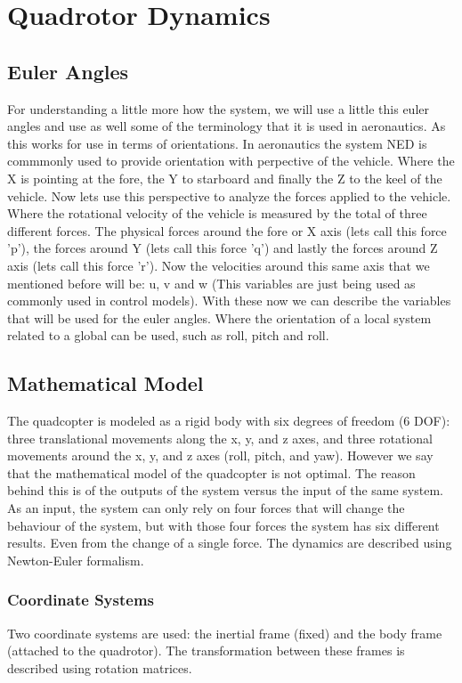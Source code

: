 \documentclass[a4paper,12pt]{report}
\begin{document}
\chapter{Quadrotor Dynamics}

\section{Euler Angles}
For understanding a little more how the system, we will use a little this euler angles and use as well some of the terminology that it is used in aeronautics. As this works for use in terms of orientations.
In aeronautics the system NED is commmonly used to provide orientation with perpective of the vehicle. Where the X is pointing at the fore, the Y to starboard and finally the Z to the keel of the vehicle.
Now lets use this perspective to analyze the forces applied to the vehicle. Where the rotational velocity of the vehicle is measured by the total of three different forces.
The physical forces around the fore or X axis (lets call this force 'p'), the forces around Y  (lets call this force 'q') and lastly the forces around Z axis (lets call this force 'r').
Now the velocities around this same axis that we mentioned before will be: u, v and w (This variables are just being used as commonly used in control models).
With these now we can describe the variables that will be used for the euler angles. Where the orientation of a local system related to a global can be used, such as roll, pitch and roll.

\section{Mathematical Model}
The quadcopter is modeled as a rigid body with six degrees of freedom (6 DOF):
three translational movements along the x, y, and z axes, and three rotational movements around the x, y, and z axes (roll, pitch, and yaw).
However we say that the mathematical model of the quadcopter is not optimal.
The reason behind this is of the outputs of the system versus the input of the same system.
As an input, the system can only rely on four forces that will change the behaviour of the system, but with those four forces the system has six different results.
Even from the change of a single force.
The dynamics are described using Newton-Euler formalism.

\subsection{Coordinate Systems}
Two coordinate systems are used: the inertial frame (fixed) and the body frame (attached to the quadrotor). The transformation between these frames is described using rotation matrices.
\end{document}
